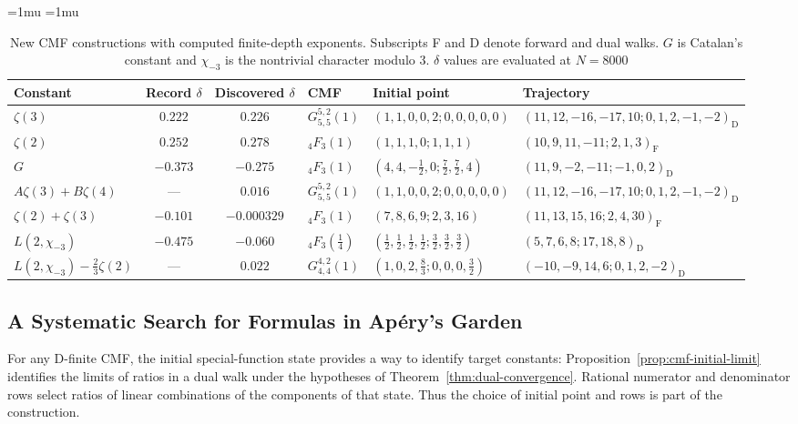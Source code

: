 \documentclass[oneside,english,11pt]{amsart}
\begin{document}
\begin{table}[htbp]
\centering
\small
\begin{adjustbox}{max width=\textwidth,center}
\thinmuskip=1mu
\medmuskip=1mu
\begin{tabular}{@{}lcclll@{}}
\toprule
Constant & Record $\delta$ & Discovered $\delta$ & CMF & Initial point & Trajectory \\
\midrule
$\zeta(3)$ & $0.222$ & $0.226$ & $G^{5,2}_{5,5}(1)$ & $(1,1,0,0,2;0,0,0,0,0)$ & $(11,12,-16,-17,10;0,1,2,-1,-2)_{\mathrm D}$ \\
$\zeta(2)$ & $0.252$ & $0.278$ & ${}_4F_3(1)$ & $(1,1,1,0;1,1,1)$ & $(10,9,11,-11;2,1,3)_{\mathrm F}$ \\
$G$ & $-0.373$ & $-0.275$ & ${}_4F_3(1)$ & $\left(4,4,-\frac{1}{2},0;\frac{7}{2},\frac{7}{2},4\right)$ & $(11,9,-2,-11;-1,0,2)_{\mathrm D}$ \\
$A\zeta(3)+B\zeta(4)$ & --- & $0.016$ & $G^{5,2}_{5,5}(1)$ & $(1,1,0,0,2;0,0,0,0,0)$ & $(11,12,-16,-17,10;0,1,2,-1,-2)_{\mathrm D}$ \\
$\zeta(2)+\zeta(3)$ & $-0.101$ & $-0.000329$ & ${}_4F_3(1)$ & $(7,8,6,9;2,3,16)$ & $(11,13,15,16;2,4,30)_{\mathrm F}$ \\
$L(2,\chi_{-3})$ & $-0.475$ & $-0.060$ & ${}_4F_3(\frac{1}{4})$ & $\left(\frac{1}{2},\frac{1}{2},\frac{1}{2},\frac{1}{2};\frac{3}{2},\frac{3}{2},\frac{3}{2}\right)$ & $(5,7,6,8;17,18,8)_{\mathrm D}$ \\
$L(2,\chi_{-3})-\frac{2}{3}\zeta(2)$ & --- & $0.022$ & $G^{4,2}_{4,4}(1)$ & $\left(1,0,2,\frac{8}{3};0,0,0,\frac{3}{2}\right)$ & $(  -10,-9,14,6;0,1,2,-2)_{\mathrm D}$ \\
\bottomrule
\end{tabular}%
\end{adjustbox}
\caption{New CMF constructions with computed finite-depth exponents.
Subscripts F and D denote forward and dual walks.
$G$ is Catalan's constant and $\chi_{-3}$ is the nontrivial character modulo 3.
$\delta$ values are evaluated at $N=8000$}
\label{tab:new-results}
\end{table}


\subsection{A Systematic Search for Formulas in Ap\'ery's Garden}
\label{subsec:new-cmf-selection}
For any D-finite CMF, the initial special-function state provides a way to identify target constants: Proposition~\ref{prop:cmf-initial-limit} identifies the limits of ratios in a dual walk under the hypotheses of Theorem~\ref{thm:dual-convergence}. Rational numerator and denominator rows select ratios of linear combinations of the components of that state. Thus the choice of initial point and rows is part of the construction.
\end{document}
